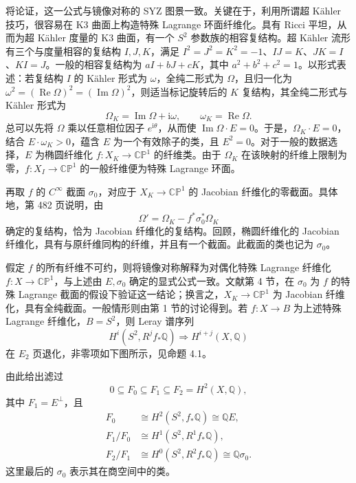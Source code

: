 将论证，这一公式与镜像对称的 SYZ 图景一致。关键在于，利用所谓超 Kähler 技巧，很容易在 K3 曲面上构造特殊 Lagrange 环面纤维化。具有 Ricci 平坦，从而为超 Kähler 度量的 K3 曲面，有一个 $S^2$ 参数族的相容复结构。超 Kähler 流形有三个与度量相容的复结构 $I,J,K$，满足 $I^2=J^2=K^2=-1$、$IJ=K$、$JK=I$、$KI=J$。一般的相容复结构为 $aI+bJ+cK$，其中 $a^2+b^2+c^2=1$。以形式表述：若复结构 $I$ 的 Kähler 形式为 $\omega$，全纯二形式为 $\Omega$，且归一化为 $\omega^2=(\operatorname{Re}\Omega)^2=(\operatorname{Im}\Omega)^2$，则适当标记旋转后的 $K$ 复结构，其全纯二形式与 Kähler 形式为
\[
\Omega_K=\operatorname{Im}\Omega+\mathrm i\omega,
\qquad\omega_K=\operatorname{Re}\Omega.
\]
总可以先将 $\Omega$ 乘以任意相位因子 $e^{\mathrm i\theta}$，从而使 $\operatorname{Im}\Omega\cdot E=0$。于是，$\Omega_K\cdot E=0$，结合 $E\cdot\omega_K>0$，蕴含 $E$ 为一个有效除子的类，且 $E^2=0$。对于一般的数据选择，$E$ 为椭圆纤维化 $f\colon X_K\to\mathbb{CP}^1$ 的纤维类。由于 $\Omega_K$ 在该映射的纤维上限制为零，$f\colon X_I\to\mathbb{CP}^1$ 的一般纤维便为特殊 Lagrange 环面。

再取 $f$ 的 $C^\infty$ 截面 $\sigma_0$，对应于 $X_K\to\mathbb{CP}^1$ 的 Jacobian 纤维化的零截面。具体地，第 482 页说明，由
\[
\Omega'=\Omega_K-f^*\sigma_0^*\Omega_K
\]
确定的复结构，恰为 Jacobian 纤维化的复结构。回顾，椭圆纤维化的 Jacobian 纤维化，具有与原纤维同构的纤维，并且有一个截面。此截面的类也记为 $\sigma_0$。

假定 $f$ 的所有纤维不可约，则将镜像对称解释为对偶化特殊 Lagrange 纤维化 $f\colon X\to\mathbb{CP}^1$，与上述由 $E,\sigma_0$ 确定的显式公式一致。文献第 4 节，在 $\sigma_0$ 为 $f$ 的特殊 Lagrange 截面的假设下验证这一结论；换言之，$X_K\to\mathbb{CP}^1$ 为 Jacobian 纤维化，具有全纯截面。一般情形则由第 1 节的讨论得到。若 $f\colon X\to B$ 为上述特殊 Lagrange 纤维化，$B=S^2$，则 Leray 谱序列
\[
H^i(S^2,R^jf_*\mathbb Q)\Longrightarrow H^{i+j}(X,\mathbb Q)
\]
在 $E_2$ 页退化，非零项如下图所示，见命题 4.1。
\begin{figure}[H]
\centering
{}
\end{figure}

由此给出滤过
\[
0\subseteq F_0\subseteq F_1\subseteq F_2=H^2(X,\mathbb Q),
\]
其中 $F_1=E^\perp$，且
\[
\begin{aligned}
F_0&\cong H^2(S^2,f_*\mathbb Q)\cong\mathbb QE,\\
F_1/F_0&\cong H^1(S^2,R^1f_*\mathbb Q),\\
F_2/F_1&\cong H^0(S^2,R^2f_*\mathbb Q)\cong\mathbb Q\sigma_0.
\end{aligned}
\]
这里最后的 $\sigma_0$ 表示其在商空间中的类。

